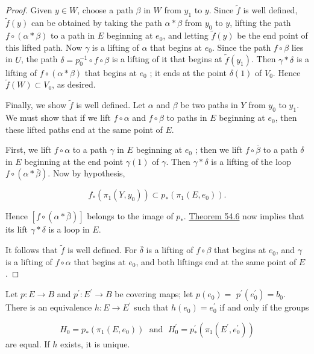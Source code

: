 \begin{proof}
Given \(y \in W\), choose a path \(\beta\) in \(W\) from \(y_{1}\) to \(y\). Since \(\widetilde{f}\) is well defined, \(\widetilde{f}( y)\) can be obtained by taking the path \(\alpha * \beta\) from \(y_{0}\) to \(y\), lifting the path \(f \circ ( {\alpha * \beta })\) to a path in \(E\) beginning at \(e_{0}\), and letting \(\widetilde{f}( y)\) be the end point of this lifted path. Now \(\gamma\) is a lifting of \(\alpha\) that begins at \(e_{0}\). Since the path \(f \circ \beta\) lies in \(U\), the path \(\delta = p_0^{-1} \circ f \circ \beta\) is a lifting of it that begins at \(\widetilde{f}( y_{1})\). Then \(\gamma * \delta\) is a lifting of \(f \circ ( {\alpha * \beta })\) that begins at \(e_{0}\) ; it ends at the point \(\delta (1)\) of \(V_{0}\). Hence \(\widetilde{f}( W) \subset {V}_{0}\), as desired.

Finally, we show \(\widetilde{f}\) is well defined. Let \(\alpha\) and \(\beta\) be two paths in \(Y\) from \(y_{0}\) to \(y_{1}\). We must show that if we lift \(f \circ \alpha\) and \(f \circ \beta\) to paths in \(E\) beginning at \(e_{0}\), then these lifted paths end at the same point of \(E\).

First, we lift \(f \circ \alpha\) to a path \(\gamma\) in \(E\) beginning at \(e_{0}\) ; then we lift \(f \circ \bar{\beta }\) to a path \(\delta\) in \(E\) beginning at the end point \(\gamma (1)\) of \(\gamma\). Then \(\gamma * \delta\) is a lifting of the loop \(f \circ ( {\alpha * \bar{\beta }})\). Now by hypothesis,

\[
f_{ * }( {{\pi }_{1}( {Y,y_{0}}) }) \subset {p}_{ * }( {{\pi }_{1}( {E,e_{0}}) }).
\]

Hence \([ {f \circ ( {\alpha * \bar{\beta }}) }]\) belongs to the image of \(p_{ * }\). \hyperref[thm:54.6]{Theorem 54.6} now implies that its lift \(\gamma * \delta\) is a loop in \(E\).

It follows that \(\widetilde{f}\) is well defined. For \(\bar{\delta }\) is a lifting of \(f \circ \beta\) that begins at \(e_{0}\), and \(\gamma\) is a lifting of \(f \circ \alpha\) that begins at \(e_{0}\), and both liftings end at the same point of \(E\).
\end{proof}
\begin{theorem}
\label{thm:\thetheorem}
	Let \(p : E \rightarrow B\) and \(p^{\prime } : E^{\prime } \rightarrow B\) be covering maps; let \(p( e_{0}) =\) \(p^{\prime }( e_0^{\prime }) = b_{0}\). There is an equivalence \(h : E \rightarrow {E}^{\prime }\) such that \(h( e_{0}) = e_0^{\prime }\) if and only if the groups

\[
H_{0} = p_{ * }( {{\pi }_{1}( {E,e_{0}}) }) \;\text{ and }\;H_0^{\prime } = p_{ * }^{\prime }( {{\pi }_{1}( {E^{\prime },e_0^{\prime }}) })
\]
are equal. If \(h\) exists, it is unique.
\end{theorem}

